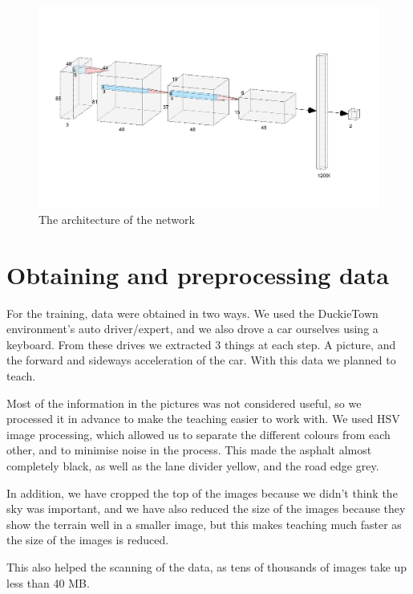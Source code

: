 \documentclass{article}
\begin{document}
\begin{figure}

  \includegraphics[width=500px]{convnet.png}
  \caption{The architecture of the network}

\end{figure}

\section*{Obtaining and preprocessing data}

For the training, data were obtained in two ways. We used the DuckieTown environment's auto driver/expert, and we also drove a car ourselves using a keyboard. From these drives we extracted 3 things at each step. A picture, and the forward and sideways acceleration of the car. With this data we planned to teach.

Most of the information in the pictures was not considered useful, so we processed it in advance to make the teaching easier to work with. We used HSV image processing, which allowed us to separate the different colours from each other, and to minimise noise in the process. This made the asphalt almost completely black, as well as the lane divider yellow, and the road edge grey.

In addition, we have cropped the top of the images because we didn't think the sky was important, and we have also reduced the size of the images because they show the terrain well in a smaller image, but this makes teaching much faster as the size of the images is reduced.

This also helped the scanning of the data, as tens of thousands of images take up less than 40 MB.

\vspace*{\baselineskip}
\end{document}
